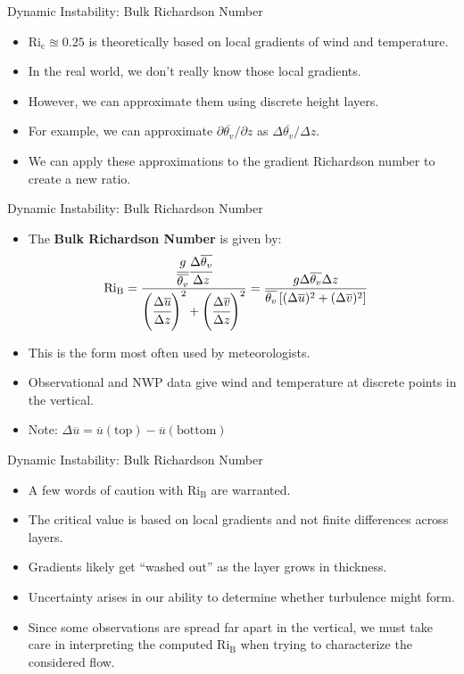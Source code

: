 \begin{frame}{Dynamic Instability: Bulk Richardson Number}

\begin{itemize}
	\item $\mathrm{Ri_c}\approxeq 0.25$ is theoretically based on local gradients of wind and temperature.
	\item In the real world, we don't really know those local gradients.
	\item However, we can approximate them using discrete height layers.
	\item For example, we can approximate $\partial \overline{\theta_v}/\partial z$ as $\Delta \overline{\theta_v} / \Delta z$.
	\item We can apply these approximations to the gradient Richardson number to create a new ratio.
\end{itemize}
\end{frame}
\begin{frame}{Dynamic Instability: Bulk Richardson Number}

\begin{itemize}
	\item The \textbf{Bulk Richardson Number} is given by:
	\begin{align*}
	\mathrm{Ri_B} &= \frac{ \cfrac{g}{\overline{\theta_v}} \cfrac{\Delta \overline{\theta_v}}{\Delta z}}{\left(\cfrac{\Delta \overline u}{\Delta z}\right)^2 + \left(\cfrac{\Delta \overline v}{\Delta z}\right)^2} = \frac{g \Delta \overline{\theta_v} \Delta z}{\overline{\theta_v} \left[(\Delta \overline u)^2 + (\Delta \overline v)^2\right]}
	\end{align*}
	\item This is the form most often used by meteorologists.
	\item Observational and NWP data give wind and temperature at discrete points in the vertical.
	\item Note: $\Delta \overline{u} = \overline{u}(\text{top}) - \overline{u}(\text{bottom})$
\end{itemize}
\end{frame}
\begin{frame}{Dynamic Instability: Bulk Richardson Number}

\begin{itemize}
	\item A few words of caution with $\mathrm{Ri_B}$ are warranted.
	\item The critical value is based on local gradients and not finite differences across layers.
	\item Gradients likely get ``washed out'' as the layer grows in thickness.
	\item Uncertainty arises in our ability to determine whether turbulence might form.
	\item Since some observations are spread far apart in the vertical, we must take care in interpreting the computed $\mathrm{Ri_B}$ when trying to characterize the considered flow.
\end{itemize}
\end{frame}



